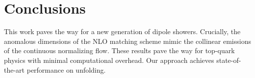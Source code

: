 \section{Conclusions}\label{sec:conclusions}

This work paves the way for a new generation of dipole showers.
Crucially, the anomalous dimensions of the NLO matching scheme mimic the
collinear emissions of the continuous normalizing flow. These results
pave the way for top-quark physics with minimal computational overhead.
Our approach achieves state-of-the-art performance on unfolding.

